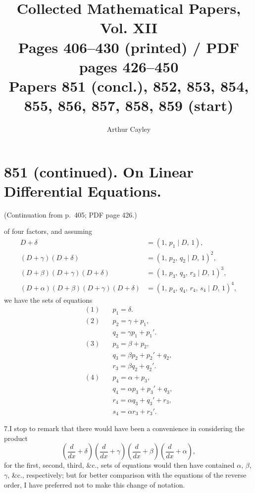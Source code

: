 \documentclass[11pt]{article}
\title{Collected Mathematical Papers, Vol. XII\\ \large Pages 406--430 (printed) / PDF pages 426--450\\ Papers 851 (concl.), 852, 853, 854, 855, 856, 857, 858, 859 (start)}
\author{Arthur Cayley}
\date{}
\begin{document}
\maketitle

\section*{851 (continued). On Linear Differential Equations.}

\noindent (Continuation from p.~405; PDF page 426.)

\medskip

\noindent of four factors, and assuming
\begin{align*}
D+\delta &= (1,\,p_1\!\mid\! D,\,1),\\
(D+\gamma)(D+\delta) &= (1,\,p_2,\,q_2\!\mid\! D,\,1)^2,\\
(D+\beta)(D+\gamma)(D+\delta) &= (1,\,p_3,\,q_3,\,r_3\!\mid\! D,\,1)^3,\\
(D+\alpha)(D+\beta)(D+\gamma)(D+\delta) &= (1,\,p_4,\,q_4,\,r_4,\,s_4\!\mid\! D,\,1)^4,
\end{align*}
we have the sets of equations
\begin{align*}
(1)\quad & p_1 = \delta.\\
(2)\quad & p_2 = \gamma+p_1,\\
         & q_2 = \gamma p_1 + p_1'.\\
(3)\quad & p_3 = \beta+p_2,\\
         & q_3 = \beta p_2 + p_2'+q_2,\\
         & r_3 = \beta q_2 + q_2'.\\
(4)\quad & p_4 = \alpha+p_3,\\
         & q_4 = \alpha p_3 + p_3'+q_3,\\
         & r_4 = \alpha q_3 + q_3'+r_3,\\
         & s_4 = \alpha r_3 + r_3'.
\end{align*}

7.\quad I stop to remark that there would have been a convenience in considering the product
\[
\left(\frac{d}{dx}+\delta\right)\!\left(\frac{d}{dx}+\gamma\right)\!\left(\frac{d}{dx}+\beta\right)\!\left(\frac{d}{dx}+\alpha\right),
\]
for the first, second, third, \&c., sets of equations would then have contained $\alpha$, $\beta$, $\gamma$, \&c., respectively; but for better comparison with the equations of the reverse order, I have preferred not to make this change of notation.

\medskip
\end{document}
